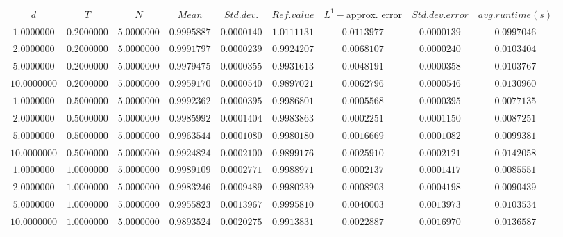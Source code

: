 \begin{tabular}{ccccccccc}
$d$ & $T$ & $N$ & $Mean$ & $Std. dev.$ & $Ref. value$ & $L^1-$approx. error & $Std. dev. error$ & $avg. runtime (s)$\\
$1.0000000$ & $0.2000000$ & $5.0000000$ & $0.9995887$ & $0.0000140$ & $1.0111131$ & $0.0113977$ & $0.0000139$ & $0.0997046$\\
$2.0000000$ & $0.2000000$ & $5.0000000$ & $0.9991797$ & $0.0000239$ & $0.9924207$ & $0.0068107$ & $0.0000240$ & $0.0103404$\\
$5.0000000$ & $0.2000000$ & $5.0000000$ & $0.9979475$ & $0.0000355$ & $0.9931613$ & $0.0048191$ & $0.0000358$ & $0.0103767$\\
$10.0000000$ & $0.2000000$ & $5.0000000$ & $0.9959170$ & $0.0000540$ & $0.9897021$ & $0.0062796$ & $0.0000546$ & $0.0130960$\\
$1.0000000$ & $0.5000000$ & $5.0000000$ & $0.9992362$ & $0.0000395$ & $0.9986801$ & $0.0005568$ & $0.0000395$ & $0.0077135$\\
$2.0000000$ & $0.5000000$ & $5.0000000$ & $0.9985992$ & $0.0001404$ & $0.9983863$ & $0.0002251$ & $0.0001150$ & $0.0087251$\\
$5.0000000$ & $0.5000000$ & $5.0000000$ & $0.9963544$ & $0.0001080$ & $0.9980180$ & $0.0016669$ & $0.0001082$ & $0.0099381$\\
$10.0000000$ & $0.5000000$ & $5.0000000$ & $0.9924824$ & $0.0002100$ & $0.9899176$ & $0.0025910$ & $0.0002121$ & $0.0142058$\\
$1.0000000$ & $1.0000000$ & $5.0000000$ & $0.9989109$ & $0.0002771$ & $0.9988971$ & $0.0002137$ & $0.0001417$ & $0.0085551$\\
$2.0000000$ & $1.0000000$ & $5.0000000$ & $0.9983246$ & $0.0009489$ & $0.9980239$ & $0.0008203$ & $0.0004198$ & $0.0090439$\\
$5.0000000$ & $1.0000000$ & $5.0000000$ & $0.9955823$ & $0.0013967$ & $0.9995810$ & $0.0040003$ & $0.0013973$ & $0.0103534$\\
$10.0000000$ & $1.0000000$ & $5.0000000$ & $0.9893524$ & $0.0020275$ & $0.9913831$ & $0.0022887$ & $0.0016970$ & $0.0136587$\\
\end{tabular}
